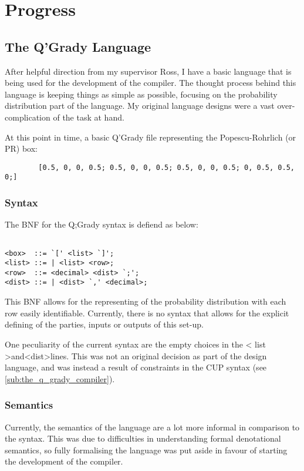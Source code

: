 \documentclass[report.tex]{subfiles}
\begin{document}
\section{Progress} %
\label{cha:progress}

\subsection{The Q'Grady Language} %
\label{sub:the_q_grady_language}
After helpful direction from my supervisor Ross, I have a basic language that is
being used for the development of the compiler. The thought process behind this
language is keeping things as simple as possible, focusing on the probability
distribution part of the language. My original language designs were a vast
over-complication of the task at hand.

At this point in time, a basic Q'Grady file representing the Popescu-Rohrlich
(or PR) box:

\begin{verbatim}
        [0.5, 0, 0, 0.5; 0.5, 0, 0, 0.5; 0.5, 0, 0, 0.5; 0, 0.5, 0.5, 0;]
\end{verbatim}

\subsubsection{Syntax} %
The BNF for the Q;Grady syntax is defiend as below: 
\begin{verbatim}

<box>  ::= `[' <list> `]';
<list> ::= | <list> <row>;
<row>  ::= <decimal> <dist> `;';
<dist> ::= | <dist> `,' <decimal>;
\end{verbatim}

This BNF allows for the representing of the probability distribution with each
row easily identifiable. Currently, there is no syntax that allows for the
explicit defining of the parties, inputs or outputs of this set-up.

One peculiarity of the current syntax are the empty choices in the \textless
list \textgreater and\textless dist\textgreater lines. This was not an original
decision as part of the design language, and was instead a result of constraints
in the CUP syntax (see \ref{sub:the_q_grady_compiler}).
\label{ssub:syntax}


\subsubsection{Semantics} %
\label{ssub:semantics}
Currently, the semantics of the language are a lot more informal in comparison
to the syntax. This was due to difficulties in understanding formal denotational semantics, so fully formalising the language was put aside in favour of starting
the development of the compiler.
\end{document}
